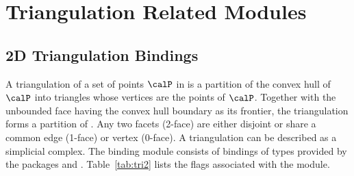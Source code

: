 \section{Triangulation Related Modules}
\label{sec:triangulationModules}

\subsection{2D Triangulation Bindings}
\label{ssec:modules:tri2}
A triangulation of a set of points $\calP$ in \Rtwo is a partition of the convex hull of $\calP$ into triangles whose vertices are the points of $\calP$. Together with the unbounded face having the convex hull boundary as its frontier, the triangulation forms a partition of \Rtwo. Any two facets (2-face) are either disjoint or share a common edge (1-face) or vertex (0-face). A triangulation can be described as a simplicial complex. The binding module \iiDTriangulationsPackage{} consists of bindings of types provided by the \cgal{} packages \iiDTriangulationsPackage{} and \iiDPeriodicTriangulationsPackage{}. Table~\ref{tab:tri2} lists the \cmake{} flags associated with the \iiDTriangulationsPackage{} module.

\begin{table}[!htp]
  \caption{\iiDTriangulationsPackage{} module flags.}
  \centering{}
  \label{tab:tri2}
\end{table}

